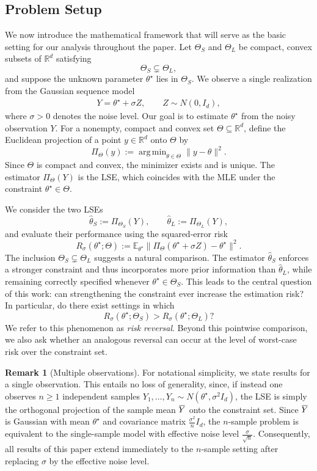 \documentclass[11pt]{article}
\theoremstyle{plain}
\theoremstyle{definition}
\newtheorem*{remark}{Remark}
\providecommand{\mathbbm}{\mathbb} %
\newcommand{\R}{\mathbbm{R}}
\newcommand{\E}{\mathbb{E}}
\newcommand{\hattheta}{\hat{\theta}}
\newcommand{\overbar}[1]{\mkern 1.5mu\overline{\mkern-1.5mu#1\mkern-1.5mu}\mkern 1.5mu}
\newcommand{\barY}{\overbar{Y}}
\DeclareMathOperator*{\argmin}{arg\,min}
\begin{document}
\subsection{Problem Setup}
We now introduce the mathematical framework that will serve as the basic setting for our analysis throughout the paper. Let $\Theta_S$ and $\Theta_L$ be compact, convex subsets of $\R^d$ satisfying
\[
\Theta_S \subsetneq \Theta_L,
\]
and suppose the unknown parameter $\theta^\star$ lies in $\Theta_S$. We observe a single realization 
from the Gaussian sequence model
\begin{align}\label{eq:GSM}
Y = \theta^\star + \sigma Z, \qquad Z \sim N(0,I_d),
\end{align}
where $\sigma>0$ denotes the noise level. Our goal is to estimate $\theta^\star$ from the noisy 
observation $Y$. For a nonempty, compact and convex set $\Theta \subseteq \R^d$, define the Euclidean projection of a point
$y \in \R^d$ onto $\Theta$ by
\[
\Pi_\Theta(y)
:= \argmin_{\theta \in \Theta} \|y - \theta\|^2.
\]
Since $\Theta$ is compact and convex, the minimizer exists and is unique. The estimator $\Pi_\Theta(Y)$ is the LSE, which coincides with the MLE under the constraint $\theta^\star \in \Theta$. 

We consider the two LSEs
\[
\hattheta_S := \Pi_{\Theta_S}(Y), \qquad
\hattheta_L := \Pi_{\Theta_L}(Y),
\]
and evaluate their performance using the squared-error risk
\[
R_\sigma(\theta^\star; \Theta)
:= \E_{\theta^\star}\|\Pi_{\Theta}(\theta^\star + \sigma Z) - \theta^\star\|^2.
\] 
The inclusion $\Theta_S \subsetneq \Theta_L$ suggests a natural comparison. The estimator $\hattheta_S$ 
enforces a stronger constraint and thus incorporates more prior information than $\hattheta_L$, 
while remaining correctly specified whenever $\theta^\star \in \Theta_S$. This leads to the central 
question of this work: can strengthening the constraint ever increase the estimation risk? In 
particular, do there exist settings in which
\[
R_\sigma(\theta^\star; \Theta_S) > R_\sigma(\theta^\star; \Theta_L)?
\]
We refer to this phenomenon as \emph{risk reversal}. Beyond this pointwise comparison, we also ask whether an analogous reversal can occur at the level of worst-case risk over the constraint set.

\begin{remark}[Multiple observations]
For notational simplicity, we state results for a single observation. This entails no loss of generality, since, if instead one observes $n\ge1$ independent samples
$
Y_1,\dots,Y_n \sim N(\theta^\star,\sigma^2 I_d)
$,
the LSE is simply the orthogonal projection of the sample mean $\barY$ onto the constraint set. Since $\barY$ is Gaussian with mean $\theta^\star$ and covariance matrix $\frac{\sigma^2}{n} I_d$, the $n$-sample problem is equivalent to the single-sample model with effective noise level $\frac{\sigma}{\sqrt n}$. Consequently, all results of this paper extend immediately to the $n$-sample setting after replacing $\sigma$ by the effective noise level.
\end{remark}
\end{document}
